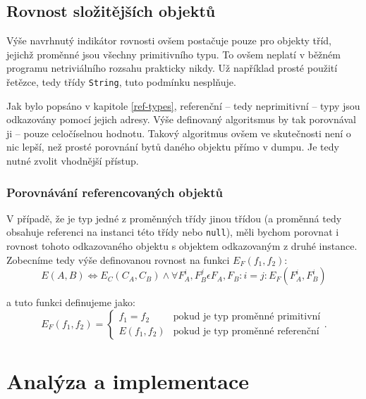 \section{Rovnost složitějších objektů}
Výše navrhnutý indikátor rovnosti ovšem postačuje pouze pro objekty tříd, jejichž proměnné jsou všechny primitivního typu. To ovšem neplatí v běžném programu netriviálního rozsahu prakticky nikdy. Už například prosté použití řetězce, tedy třídy \texttt{String}, tuto podmínku nesplňuje.

Jak bylo popsáno v kapitole \ref{ref-types}, referenční -- tedy neprimitivní -- typy jsou odkazovány pomocí jejich adresy. Výše definovaný algoritsmus by tak porovnával ji -- pouze celočíselnou hodnotu. Takový algoritmus ovšem ve skutečnosti není o nic lepší, než prosté porovnání bytů daného objektu přímo v dumpu. Je tedy nutné zvolit vhodnější přístup.

\subsection{Porovnávání referencovaných objektů}
V případě, že je typ jedné z proměnných třídy jinou třídou (a proměnná tedy obsahuje referenci na instanci této třídy nebo \texttt{null}), měli bychom porovnat i rovnost tohoto odkazovaného objektu s objektem odkazovaným z druhé instance. Zobecníme tedy výše definovanou rovnost na funkci $E_F(f_1, f_2)$:
    $$ E(A, B) \Leftrightarrow E_C(C_A, C_B) \wedge \forall F_A^i, F_B^j \epsilon F_A, F_B: i = j: E_F(F_A^i, F_B^i)$$

a tuto funkci definujeme jako:
\begin{equation}
    E_F(f_1, f_2)=
      \begin{cases}
        f_1 = f_2 & \text{pokud je typ proměnné primitivní} \\
        E(f_1, f_2) & \text{pokud je typ proměnné referenční}
      \end{cases}.
\end{equation}

\chapter{Analýza a implementace}
